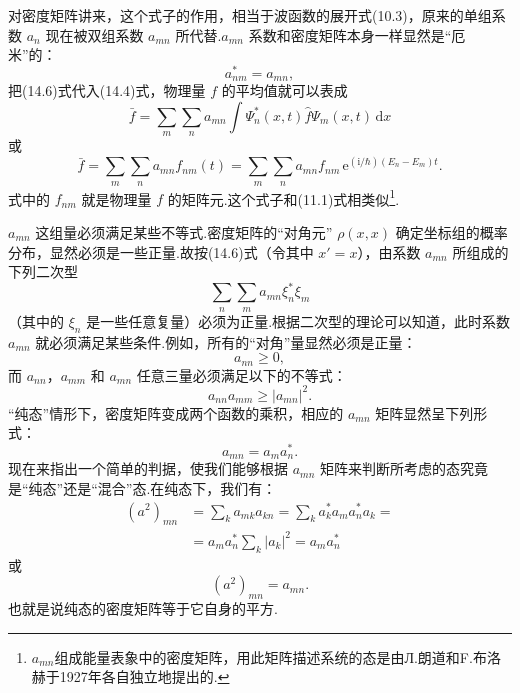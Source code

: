 对密度矩阵讲来，这个式子的作用，相当于波函数的展开式(10.3)，原来的单组系数 $a_n$ 现在被双组系数 $a_{mn}$ 所代替.$a_{mn}$ 系数和密度矩阵本身一样显然是“厄米”的：
\begin{equation}
  a_{nm}^{*}=a_{mn},
\end{equation}
把(14.6)式代入(14.4)式，物理量 $f$ 的平均值就可以表成
\begin{equation*}
  \bar{f}=\sum_m\sum_na_{mn}
  \int\varPsi_n^{*}(x,t)\hat{f}\varPsi_m(x,t)\,\mathrm{d}x
\end{equation*}
或
\begin{equation}
  \bar{f}=\sum_m\sum_na_{mn}f_{nm}(t)
  =\sum_m\sum_na_{mn}f_{nm}\,
  \mathrm{e}^{(\mathrm{i}/\hbar)(E_n-E_m)t}.
\end{equation}
式中的 $f_{nm}$ 就是物理量 $f$ 的矩阵元.这个式子和(11.1)式相类似\footnote{$a_{mn}$组成能量表象中的密度矩阵，用此矩阵描述系统的态是由Л.朗道和F.布洛赫于1927年各自独立地提出的.}.

$a_{mn}$ 这组量必须满足某些不等式.密度矩阵的“对角元” $\rho(x,x)$ 确定坐标组的概率分布，显然必须是一些正量.故按(14.6)式（令其中 $x'=x$），由系数 $a_{mn}$ 所组成的下列二次型
\begin{equation*}
  \sum_n\sum_ma_{mn}\xi_n^{*}\xi_m
\end{equation*}
（其中的 $\xi_n$ 是一些任意复量）必须为正量.根据二次型的理论可以知道，此时系数 $a_{mn}$ 就必须满足某些条件.例如，所有的“对角”量显然必须是正量：
\begin{equation}
  a_{nn}\geqslant0,
\end{equation}
而 $a_{nn}$，$a_{mm}$ 和 $a_{mn}$ 任意三量必须满足以下的不等式：
\begin{equation}
  a_{nn}a_{mm}\geqslant|a_{mn}|^{2}.
\end{equation}
“纯态”情形下，密度矩阵变成两个函数的乘积，相应的 $a_{mn}$ 矩阵显然呈下列形式：
\begin{equation}
  a_{mn}=a_ma_n^{*}.
\end{equation}
现在来指出一个简单的判据，使我们能够根据 $a_{mn}$ 矩阵来判断所考虑的态究竟是“纯态”还是“混合”态.在纯态下，我们有：
\begin{equation*}
\begin{aligned}
  (a^{2})_{mn}&=\sum_ka_{mk}a_{kn}
  =\sum_ka_k^{*}a_ma_n^{*}a_k=\\
  &=a_ma_n^{*}\sum_k|a_k|^{2}=a_ma_n^{*}
\end{aligned}
\end{equation*}
或
\begin{equation}
  (a^{2})_{mn}=a_{mn}.
\end{equation}
也就是说纯态的密度矩阵等于它自身的平方.

